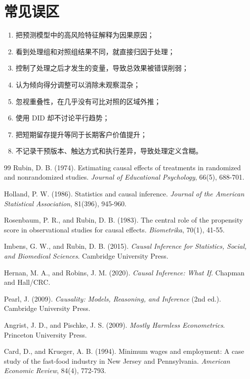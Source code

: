 \documentclass[UTF8,fontset=fandol,openany,zihao=-4]{ctexbook}
\begin{document}
\section*{常见误区}

\begin{enumerate}
  \item 把预测模型中的高风险特征解释为因果原因；
  \item 看到处理组和对照组结果不同，就直接归因于处理；
  \item 控制了处理之后才发生的变量，导致总效果被错误削弱；
  \item 认为倾向得分调整可以消除未观察混杂；
  \item 忽视重叠性，在几乎没有可比对照的区域外推；
  \item 使用 DID 却不讨论平行趋势；
  \item 把短期留存提升等同于长期客户价值提升；
  \item 不记录干预版本、触达方式和执行差异，导致处理定义含糊。
\end{enumerate}

\begin{thebibliography}{99}
Rubin, D. B. (1974).
\newblock Estimating causal effects of treatments in randomized and nonrandomized studies.
\newblock \emph{Journal of Educational Psychology}, 66(5), 688-701.

Holland, P. W. (1986).
\newblock Statistics and causal inference.
\newblock \emph{Journal of the American Statistical Association}, 81(396), 945-960.

Rosenbaum, P. R., and Rubin, D. B. (1983).
\newblock The central role of the propensity score in observational studies for causal effects.
\newblock \emph{Biometrika}, 70(1), 41-55.

Imbens, G. W., and Rubin, D. B. (2015).
\newblock \emph{Causal Inference for Statistics, Social, and Biomedical Sciences}.
\newblock Cambridge University Press.

Hernan, M. A., and Robins, J. M. (2020).
\newblock \emph{Causal Inference: What If}.
\newblock Chapman and Hall/CRC.

Pearl, J. (2009).
\newblock \emph{Causality: Models, Reasoning, and Inference} (2nd ed.).
\newblock Cambridge University Press.

Angrist, J. D., and Pischke, J. S. (2009).
\newblock \emph{Mostly Harmless Econometrics}.
\newblock Princeton University Press.

Card, D., and Krueger, A. B. (1994).
\newblock Minimum wages and employment: A case study of the fast-food industry in New Jersey and Pennsylvania.
\newblock \emph{American Economic Review}, 84(4), 772-793.
\end{thebibliography}
\end{document}
